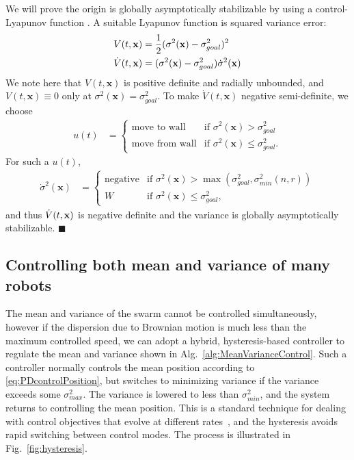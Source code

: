 We will prove the origin is globally asymptotically stabilizable by using a control-Lyapunov function \cite{Lyapunov1992}.  A suitable Lyapunov function is squared variance error:
\begin{align}
\label{eq:LyapunovVariance}
V(t,\bf{x})  &= \frac{1}{2} (\sigma^2(\mathbf{x}) - \sigma^2_{goal})^2\\
\dot{V}(t,\bf{x}) &= (\sigma^2(\mathbf{x})-\sigma^2_{goal})\dot{\sigma}^2(\mathbf{x})
\end{align}
We note here that $V(t,\mathbf{x})$ is positive definite and radially unbounded, and $V(t,\mathbf{x}) \equiv 0$ only at $\sigma^2(\mathbf{x}) = \sigma^2_{goal}$.
To make $\dot{V}(t,\mathbf{x})$ negative semi-definite, we choose
\begin{align}
u(t) &=   \begin{cases}
	 \mbox{move to wall} &\mbox{if } \sigma^2(\mathbf{x})>\sigma^2_{goal} \\ 
	 \mbox{move from wall} & \mbox{if } \sigma^2(\mathbf{x}) \le \sigma^2_{goal}.
\end{cases} 
\end{align}
 For such a $u(t)$,
 \begin{align}
\dot{\sigma}^2(\mathbf{x}) &=   \begin{cases}
	 \mbox{negative} &\mbox{if } \sigma^2(\mathbf{x})> \max(\sigma^2_{goal}, \sigma^2_{min}(n,r))  \\ 
	 W & \mbox{if } \sigma^2(\mathbf{x}) \le \sigma^2_{goal},
\end{cases} 
\end{align} and thus
$\dot{V}(t,{\bf x})$ is negative definite and the variance is globally asymptotically stabilizable. \hfill$\blacksquare$ 





\subsection{Controlling both mean and variance of many robots}

The mean and variance of the swarm cannot be controlled simultaneously, however if the dispersion due to Brownian motion is much less than the maximum controlled speed, we can adopt a hybrid, hysteresis-based controller to regulate the mean and variance shown in Alg.~\ref{alg:MeanVarianceControl}.  Such a controller normally controls the mean position according to \eqref{eq:PDcontrolPosition}, but switches to minimizing variance if the variance exceeds some $\sigma_{max}^2$.  The variance is lowered to less than $\sigma_{min}^2$, and the system returns to controlling the mean position. This is a standard technique for dealing with control objectives that evolve at different rates~\cite{Sadraddini2015,kloetzer2007temporal}, and the hysteresis avoids rapid switching between control modes. The process is illustrated in Fig.~\ref{fig:hysteresis}. 


